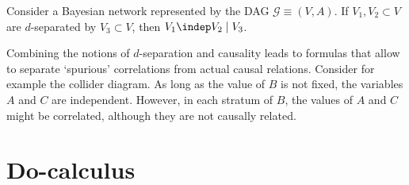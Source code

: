     \begin{property}
        Consider a Bayesian network represented by the DAG $\mathcal{G}\equiv(V,A)$. If $V_1,V_2\subset V$ are $d$-separated by $V_3\subset V$, then $V_1\indep V_2\mid V_3$.
    \end{property}


    Combining the notions of $d$-separation and causality leads to formulas that allow to separate `spurious' correlations from actual causal relations. Consider for example the collider diagram. As long as the value of $B$ is not fixed, the variables $A$ and $C$ are independent. However, in each stratum of $B$, the values of $A$ and $C$ might be correlated, although they are not causally related.

\section{Do-calculus}


